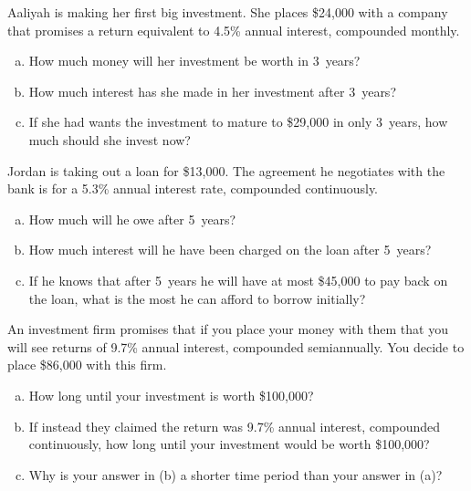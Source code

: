 \documentclass[11pt,letterpaper]{article}
\begin{document}

 Aaliyah is making her first big investment. She places \$24,000 with a company that promises a return equivalent to 4.5\% annual interest, compounded monthly.
	\begin{enumerate}[(a)]
	\item How much money will her investment be worth in 3~years?
	\item How much interest has she made in her investment after 3~years?
	\item If she had wants the investment to mature to \$29,000 in only 3~years, how much should she invest now?
	\end{enumerate}



\newpage



 Jordan is taking out a loan for \$13,000. The agreement he negotiates with the bank is for a 5.3\% annual interest rate, compounded continuously. 
	\begin{enumerate}[(a)]
	\item How much will he owe after 5~years?
	\item How much interest will he have been charged on the loan after 5~years?
	\item If he knows that after 5~years he will have at most \$45,000 to pay back on the loan, what is the most he can afford to borrow initially? 
	\end{enumerate}



\newpage



 An investment firm promises that if you place your money with them that you will see returns of 9.7\% annual interest, compounded semiannually. You decide to place \$86,000 with this firm. 
	\begin{enumerate}[(a)]
	\item How long until your investment is worth \$100,000?
	\item If instead they claimed the return was 9.7\% annual interest, compounded continuously, how long until your investment would be worth \$100,000?
	\item Why is your answer in (b) a shorter time period than your answer in (a)?
	\end{enumerate}
\end{document}
